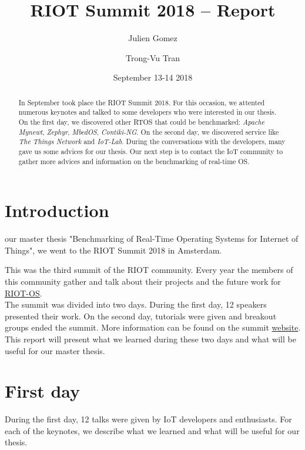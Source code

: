 \documentclass[journal, a4paper]{../IEEEtran}
\begin{document}
\title{RIOT Summit 2018 -- Report}
\author{Julien Gomez \and Trong-Vu Tran}
\date{September 13-14 2018}
\maketitle

\begin{abstract}
    In September took place the RIOT Summit 2018.
	For this occasion, we attented numerous keynotes and talked to some developers who were interested in our thesis. 
    On the first day, we discovered other RTOS that could be benchmarked: \textit{Apache Mynewt}, \textit{Zephyr}, \textit{MbedOS}, \textit{Contiki-NG}. 
    On the second day, we discovered service like \textit{The Things Network} and \textit{IoT-Lab}.
    During the conversations with the developers, many gave us some advices for our thesis. 
    Our next step is to contact the IoT community to gather more advices and information on the benchmarking of real-time OS.
\end{abstract}

\section{Introduction}
 our master thesis "Benchmarking of Real-Time Operating Systems for Internet of Things", we went to the RIOT Summit 2018 in Amsterdam.
    
This was the third summit of the RIOT community. 
Every year the members of this community gather and talk about their projects and the future work for \href{http://riot-os.org}{RIOT-OS}. \\

The summit was divided into two days. 
During the first day, 12 speakers presented their work. On the second day, tutorials were given and breakout groups ended the summit. 
More information can be found on the summit \href{http://summit.riot-os.org/2018/}{website}. \\

This report will present what we learned during these two days and what will be useful for our master thesis.

\section{First day}
During the first day, 12 talks were given by IoT developers and enthusiasts.
For each of the keynotes, we describe what we learned and what will be useful for our thesis.
\end{document}
